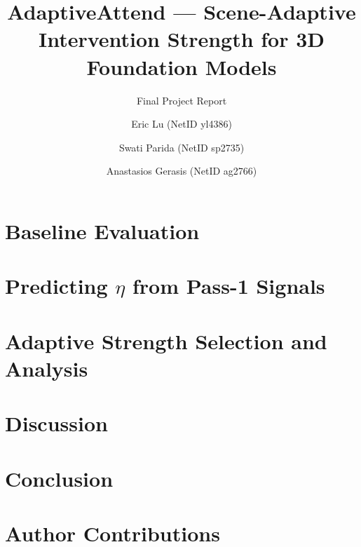 \documentclass[sigconf,nonacm]{acmart}
\title[AdaptiveAttend]{AdaptiveAttend --- Scene-Adaptive Intervention Strength for 3D Foundation Models}
\subtitle{Final Project Report}
\author{Eric Lu (NetID yl4386)}
\author{Swati Parida (NetID sp2735)}
\author{Anastasios Gerasis (NetID ag2766)}
\begin{document}
\raggedbottom
\begin{abstract}
\mbox{}\par\vspace{0.8cm}
\end{abstract}
\maketitle





\section{Baseline Evaluation}
\label{sec:eric}

\vspace{0.7cm}

\section{Predicting \texorpdfstring{$\eta$}{eta} from Pass-1 Signals}
\label{sec:eric-pass1}

\vspace{0.7cm}

\section{Adaptive Strength Selection and Analysis}
\label{sec:swati}

\vspace{0.7cm}


\FloatBarrier

\section{Discussion}

\vspace{0.9cm}

\section{Conclusion}

\vspace{0.9cm}

\section{Author Contributions}




\clearpage
\onecolumn
\appendix


\end{document}
